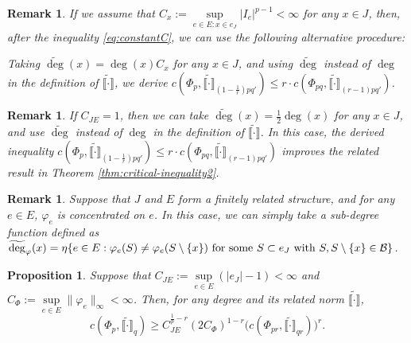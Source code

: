 \documentclass[12pt,a4paper]{article}
\newtheorem{prop}[theorem]{Proposition}
\newtheorem{remark}[theorem]{Remark}
\begin{document}


\begin{remark}
If we assume that  $C_{x}:=\sup\limits_{e\in E:x\in e_J} |I_e|^{p-1}<\infty$ for any $x\in J$, then, after the inequality \eqref{eq:constantC}, we can use the following alternative procedure:

Taking $\widetilde{\deg} (x)=\deg (x)C_x$ for any $x\in J$, and using $\widetilde{\deg}$ instead of $\deg$ in the definition of $\widetilde{\llbracket \cdot\rrbracket}$, we derive $c(\Phi_p,\widetilde{\llbracket \cdot\rrbracket}_{  (1-\frac1r)pq' })\le r \cdot  c(\Phi_{pq},\widetilde{\llbracket \cdot\rrbracket}_{(r-1)pq'}) $.
\end{remark}

\begin{remark}
If $C_{JE}=1$, then we can take $\widetilde{\deg} (x)=\frac12\deg (x)$ for any $x\in J$, and use $\widetilde{\deg}$ instead of $\deg$ in the definition of $\widetilde{\llbracket \cdot\rrbracket}$. In this case, the derived inequality 
$c(\Phi_p,\widetilde{\llbracket \cdot\rrbracket}_{  (1-\frac1r)pq' })\le r \cdot  c(\Phi_{pq},\widetilde{\llbracket \cdot\rrbracket}_{(r-1)pq'}) $ improves %
the related result in Theorem \ref{thm:critical-inequality2}.
\end{remark}


\begin{remark}
Suppose that  $J$ and $E$ form a finitely related structure, and for any $e\in E$, $\varphi_e$ is concentrated on $e$. 
In this case, we can simply take a sub-degree function defined as $\widetilde{\deg}_\varphi(x)=\eta\{e\in E: \varphi_e(S)\ne\varphi_e(S\setminus \{x\})\text{ for some }S\subset e_J\text{ with }S,S\setminus \{x\}\in \mathcal{B}\}$.       
\end{remark}

\begin{prop}\label{pro:phi-cpq21-r}
Suppose that $C_{JE}:=\sup\limits_{e\in E}(|e_J|-1)<\infty$ and $C_{\Phi}:=\sup\limits_{e\in E}\|\varphi_e\|_\infty<\infty$. Then, for any degree and its related norm $\widetilde{\llbracket \cdot\rrbracket}$, 
$$c(\Phi_p,\widetilde{\llbracket \cdot\rrbracket}_{q})\ge  C_{JE}^{\frac1p-r}(2C_{\Phi})^{1-r}\big(c(\Phi_{pr},\widetilde{\llbracket \cdot\rrbracket}_{qr})\big)^r.$$ 
\end{prop}
\end{document}
